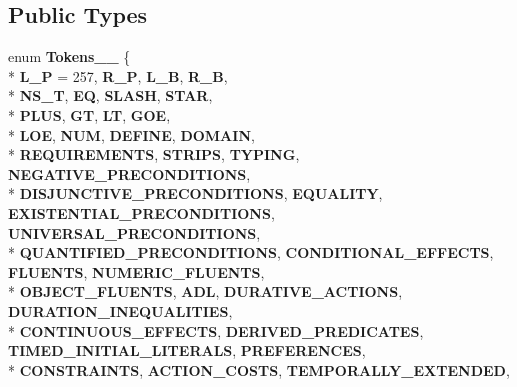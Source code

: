 \subsection*{Public Types}
\begin{DoxyCompactItemize}
\item 
\hypertarget{classParserBase_ad5f11f6aa9de30301eeee1d00e460af2}{enum {\bfseries Tokens\+\_\+\+\_\+} \{ \\*
{\bfseries L\+\_\+\+P} = 257, 
{\bfseries R\+\_\+\+P}, 
{\bfseries L\+\_\+\+B}, 
{\bfseries R\+\_\+\+B}, 
\\*
{\bfseries N\+S\+\_\+\+T}, 
{\bfseries E\+Q}, 
{\bfseries S\+L\+A\+S\+H}, 
{\bfseries S\+T\+A\+R}, 
\\*
{\bfseries P\+L\+U\+S}, 
{\bfseries G\+T}, 
{\bfseries L\+T}, 
{\bfseries G\+O\+E}, 
\\*
{\bfseries L\+O\+E}, 
{\bfseries N\+U\+M}, 
{\bfseries D\+E\+F\+I\+N\+E}, 
{\bfseries D\+O\+M\+A\+I\+N}, 
\\*
{\bfseries R\+E\+Q\+U\+I\+R\+E\+M\+E\+N\+T\+S}, 
{\bfseries S\+T\+R\+I\+P\+S}, 
{\bfseries T\+Y\+P\+I\+N\+G}, 
{\bfseries N\+E\+G\+A\+T\+I\+V\+E\+\_\+\+P\+R\+E\+C\+O\+N\+D\+I\+T\+I\+O\+N\+S}, 
\\*
{\bfseries D\+I\+S\+J\+U\+N\+C\+T\+I\+V\+E\+\_\+\+P\+R\+E\+C\+O\+N\+D\+I\+T\+I\+O\+N\+S}, 
{\bfseries E\+Q\+U\+A\+L\+I\+T\+Y}, 
{\bfseries E\+X\+I\+S\+T\+E\+N\+T\+I\+A\+L\+\_\+\+P\+R\+E\+C\+O\+N\+D\+I\+T\+I\+O\+N\+S}, 
{\bfseries U\+N\+I\+V\+E\+R\+S\+A\+L\+\_\+\+P\+R\+E\+C\+O\+N\+D\+I\+T\+I\+O\+N\+S}, 
\\*
{\bfseries Q\+U\+A\+N\+T\+I\+F\+I\+E\+D\+\_\+\+P\+R\+E\+C\+O\+N\+D\+I\+T\+I\+O\+N\+S}, 
{\bfseries C\+O\+N\+D\+I\+T\+I\+O\+N\+A\+L\+\_\+\+E\+F\+F\+E\+C\+T\+S}, 
{\bfseries F\+L\+U\+E\+N\+T\+S}, 
{\bfseries N\+U\+M\+E\+R\+I\+C\+\_\+\+F\+L\+U\+E\+N\+T\+S}, 
\\*
{\bfseries O\+B\+J\+E\+C\+T\+\_\+\+F\+L\+U\+E\+N\+T\+S}, 
{\bfseries A\+D\+L}, 
{\bfseries D\+U\+R\+A\+T\+I\+V\+E\+\_\+\+A\+C\+T\+I\+O\+N\+S}, 
{\bfseries D\+U\+R\+A\+T\+I\+O\+N\+\_\+\+I\+N\+E\+Q\+U\+A\+L\+I\+T\+I\+E\+S}, 
\\*
{\bfseries C\+O\+N\+T\+I\+N\+U\+O\+U\+S\+\_\+\+E\+F\+F\+E\+C\+T\+S}, 
{\bfseries D\+E\+R\+I\+V\+E\+D\+\_\+\+P\+R\+E\+D\+I\+C\+A\+T\+E\+S}, 
{\bfseries T\+I\+M\+E\+D\+\_\+\+I\+N\+I\+T\+I\+A\+L\+\_\+\+L\+I\+T\+E\+R\+A\+L\+S}, 
{\bfseries P\+R\+E\+F\+E\+R\+E\+N\+C\+E\+S}, 
\\*
{\bfseries C\+O\+N\+S\+T\+R\+A\+I\+N\+T\+S}, 
{\bfseries A\+C\+T\+I\+O\+N\+\_\+\+C\+O\+S\+T\+S}, 
{\bfseries T\+E\+M\+P\+O\+R\+A\+L\+L\+Y\+\_\+\+E\+X\+T\+E\+N\+D\+E\+D}, 
}
\end{DoxyCompactItemize}
